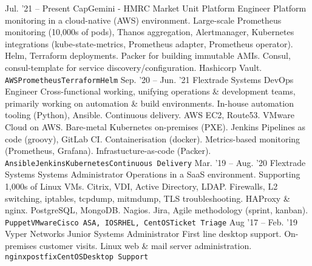 \documentclass[10pt]{developercv} %
\begin{document}
\begin{entrylist}
  \entry
    {Jul. '21 -- Present}
    {CapGemini - HMRC Market Unit}
    {Platform Engineer}
    {Platform monitoring in a cloud-native (AWS) environment. Large-scale Prometheus monitoring (10,000s of pods), Thanos aggregation, Alertmanager, Kubernetes \linebreak integrations (kube-state-metrics, Prometheus adapter, Prometheus \linebreak operator). Helm, Terraform deployments. Packer for building immutable AMIs.  \linebreak Consul, consul-template for service discovery/configuration. Hashicorp Vault.\\ \texttt{AWS}\slashsep\texttt{Prometheus}\slashsep\texttt{Terraform}\slashsep\texttt{Helm}}
	\entry
		{Sep. '20 -- Jun. '21}
		{Flextrade Systems}
		{DevOps Engineer}
    {Cross-functional working, unifying operations \& development teams, primarily working \linebreak on automation \& build environments. In-house automation tooling (Python), \linebreak Ansible. Continuous delivery. AWS EC2, Route53. VMware Cloud on AWS. Bare-metal \linebreak Kubernetes on-premises (PXE). Jenkins Pipelines as code (groovy), GitLab CI. \linebreak Containerisation (docker). Metrics-based monitoring (Prometheus, Grafana). Infrastucture-as-code (Packer).\\ \texttt{Ansible}\slashsep\texttt{Jenkins}\slashsep\texttt{Kubernetes}\slashsep\texttt{Continuous Delivery}}
	\entry
		{Mar. '19 -- Aug. '20}
		{Flextrade Systems}
		{Systems Administrator}
    {Operations in a SaaS environment. Supporting 1,000s of Linux VMs. Citrix, VDI, \linebreak Active Directory, LDAP. Firewalls, L2 switching, iptables, tcpdump, mitmdump, \linebreak TLS troubleshooting. HAProxy \& nginx. PostgreSQL, MongoDB. Nagios. Jira, Agile methodology (sprint, kanban).\\ \texttt{Puppet}\slashsep\texttt{VMware}\slashsep\texttt{Cisco ASA, IOS}\slashsep\texttt{RHEL, CentOS}\slashsep\texttt{Ticket Triage}}
	\entry
		{Aug '17 -- Feb. '19}
		{Vyper Networks}
		{Junior Systems Administrator}
    {First line desktop support. On-premises customer visits. Linux web \& mail server \linebreak administration.\\ \texttt{nginx}\slashsep\texttt{postfix}\slashsep\texttt{CentOS}\slashsep\texttt{Desktop Support}}
\end{entrylist}
\end{document}
